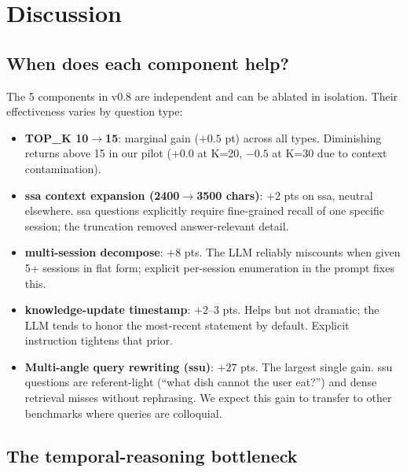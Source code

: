 
\section{Discussion}
\label{sec:discussion}

\subsection{When does each component help?}

The 5 components in v0.8 are independent and can be ablated in
isolation. Their effectiveness varies by question type:

\begin{itemize}
\item \textbf{TOP\_K 10\(\to\)15}: marginal gain (\(+0.5\) pt) across all
  types. Diminishing returns above 15 in our pilot (\(+0.0\) at K=20,
  \(-0.5\) at K=30 due to context contamination).

\item \textbf{ssa context expansion (2400\(\to\)3500 chars)}: \(+2\) pts on
  ssa, neutral elsewhere. ssa questions explicitly require fine-grained
  recall of one specific session; the truncation removed answer-relevant
  detail.

\item \textbf{multi-session decompose}: \(+8\) pts. The LLM reliably
  miscounts when given 5+ sessions in flat form; explicit per-session
  enumeration in the prompt fixes this.

\item \textbf{knowledge-update timestamp}: \(+2\)--\(3\) pts. Helps but
  not dramatic; the LLM tends to honor the most-recent statement
  by default. Explicit instruction tightens that prior.

\item \textbf{Multi-angle query rewriting (ssu)}: \(+27\) pts. The
  largest single gain. ssu questions are referent-light (``what dish
  cannot the user eat?'') and dense retrieval misses without
  rephrasing. We expect this gain to transfer to other benchmarks
  where queries are colloquial.
\end{itemize}

\subsection{The temporal-reasoning bottleneck}

